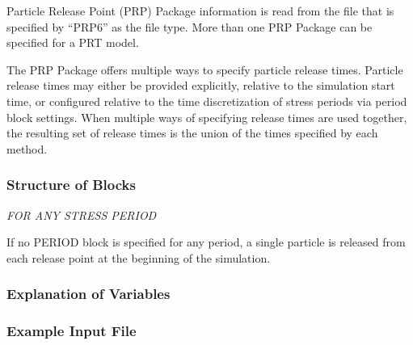 Particle Release Point (PRP) Package information is read from the file that is specified by ``PRP6'' as the file type.  More than one PRP Package can be specified for a PRT model. 

The PRP Package offers multiple ways to specify particle release times.  Particle release times may either be provided explicitly, relative to the simulation start time, or configured relative to the time discretization of stress periods via period block settings.  When multiple ways of specifying release times are used together, the resulting set of release times is the union of the times specified by each method.

\vspace{5mm}
\subsubsection{Structure of Blocks}




\vspace{5mm}
\noindent \textit{FOR ANY STRESS PERIOD}

\packageperioddescription \: If no PERIOD block is specified for any period, a single particle is released from each release point at the beginning of the simulation.

\vspace{5mm}
\subsubsection{Explanation of Variables}
\begin{description}

\end{description}

\vspace{5mm}
\subsubsection{Example Input File}


